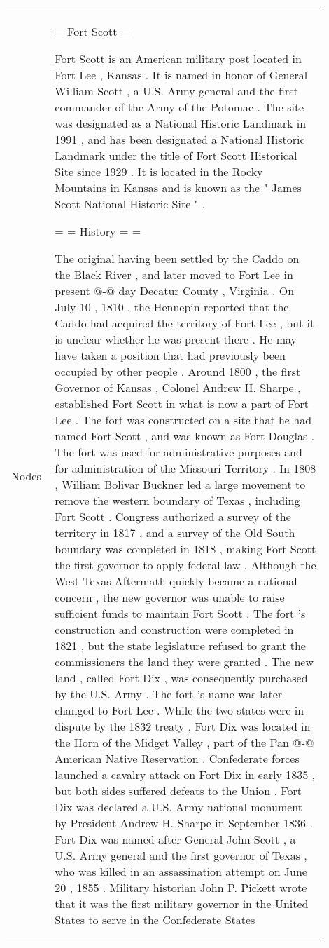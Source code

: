 \documentclass[11pt]{article}
\begin{document}
\begin{table*}[h]
\begin{tabular}{p{0.1\linewidth} | p{0.8\linewidth}}
{  } \\

        \cline{1-2}
        Nodes &  {\tiny = Fort Scott = 
 
 Fort Scott is an American military post located in Fort Lee , Kansas . It is named in honor of General William Scott , a U.S. Army general and the first commander of the Army of the Potomac . The site was designated as a National Historic Landmark in 1991 , and has been designated a National Historic Landmark under the title of Fort Scott Historical Site since 1929 . It is located in the Rocky Mountains in Kansas and is known as the " James Scott National Historic Site " . 
 
 = = History = = 
 
 The original having been settled by the Caddo on the Black River , and later moved to Fort Lee in present @-@ day Decatur County , Virginia . On July 10 , 1810 , the Hennepin reported that the Caddo had acquired the territory of Fort Lee , but it is unclear whether he was present there . He may have taken a position that had previously been occupied by other people . Around 1800 , the first Governor of Kansas , Colonel Andrew H. Sharpe , established Fort Scott in what is now a part of Fort Lee . The fort was constructed on a site that he had named Fort Scott , and was known as Fort Douglas . The fort was used for administrative purposes and for administration of the Missouri Territory . 
 In 1808 , William Bolivar Buckner led a large movement to remove the western boundary of Texas , including Fort Scott . Congress authorized a survey of the territory in 1817 , and a survey of the Old South boundary was completed in 1818 , making Fort Scott the first governor to apply federal law . Although the West Texas Aftermath quickly became a national concern , the new governor was unable to raise sufficient funds to maintain Fort Scott . 
 The fort 's construction and construction were completed in 1821 , but the state legislature refused to grant the commissioners the land they were granted . The new land , called Fort Dix , was consequently purchased by the U.S. Army . The fort 's name was later changed to Fort Lee . 
 While the two states were in dispute by the 1832 treaty , Fort Dix was located in the Horn of the Midget Valley , part of the Pan @-@ American Native Reservation . Confederate forces launched a cavalry attack on Fort Dix in early 1835 , but both sides suffered defeats to the Union . Fort Dix was declared a U.S. Army national monument by President Andrew H. Sharpe in September 1836 . 
 Fort Dix was named after General John Scott , a U.S. Army general and the first governor of Texas , who was killed in an assassination attempt on June 20 , 1855 . Military historian John P. Pickett wrote that it was the first military governor in the United States to serve in the Confederate States
 
}
\end{tabular}
\end{table*}
\end{document}
